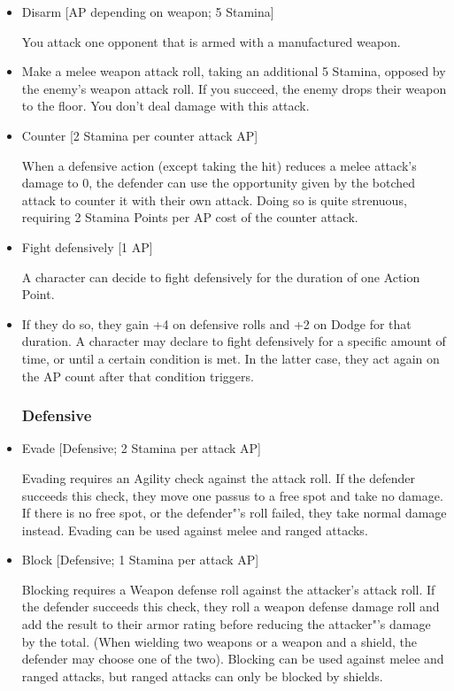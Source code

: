 \begin{itemize}
\item Disarm [AP depending on weapon; 5 Stamina]

You attack one opponent that is armed with a manufactured weapon.


\item Make a melee weapon attack roll, taking an additional 5 Stamina, opposed by the enemy's weapon attack roll.
If you succeed, the enemy drops their weapon to the floor.
You don't deal damage with this attack.\\


\item Counter [2 Stamina per counter attack AP]

When a defensive action (except taking the hit) reduces a melee attack's damage to 0, the defender can use the opportunity given by the botched attack to counter it with their own attack.
Doing so is quite strenuous, requiring 2 Stamina Points per AP cost of the counter attack.


\item Fight defensively [1 AP]

A character can decide to fight defensively for the duration of one Action Point.

\item If they do so, they gain +4 on defensive rolls and +2 on Dodge for that duration.
A character may declare to fight defensively for a specific amount of time, or until a certain condition is met.
In the latter case, they act again on the AP count after that condition triggers.

\subsubsection{Defensive}


\item Evade [Defensive; 2 Stamina per attack AP]

Evading requires an Agility check against the attack roll.
If the defender succeeds this check, they move one passus to a free spot and take no damage.
If there is no free spot, or the defender"'s roll failed, they take normal damage instead.
Evading can be used against melee and ranged attacks.

\item Block [Defensive; 1 Stamina per attack AP]

Blocking requires a Weapon defense roll against the attacker's attack roll.
If the defender succeeds this check, they roll a weapon defense damage roll and add the result to their armor rating before reducing the attacker"'s damage by the total.
(When wielding two weapons or a weapon and a shield, the defender may choose one of the two).
Blocking can be used against melee and ranged attacks, but ranged attacks can only be blocked by shields.


\end{itemize}
